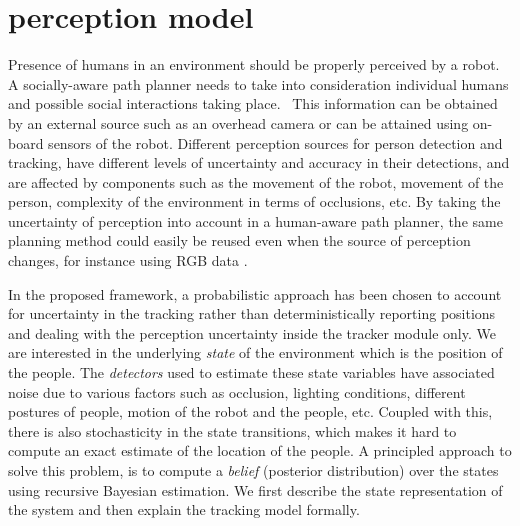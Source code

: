 \section{perception model}
\label{perception_model}


Presence of humans in an environment should be properly perceived by a robot. A socially-aware path planner needs to take into consideration individual humans and possible social interactions taking place.%
~This information can be obtained by an external source such as an overhead camera or can be attained using on-board sensors of the robot. Different perception sources for person detection and tracking, have different levels of uncertainty and accuracy in their detections, and are affected by components such as the movement of the robot, movement of the person, complexity of the environment in terms of occlusions, etc. By taking the uncertainty of perception into account in a human-aware path planner, the same planning method could easily be reused even when the source of perception changes, for instance using RGB data \cite{linder2016people}. 

In the proposed framework, a probabilistic approach has been chosen to account for uncertainty in the tracking rather than deterministically reporting positions and dealing with the perception uncertainty inside the tracker module only. We are interested in the underlying \textit{state} of the environment which is the position of the people. The \textit{detectors} used to estimate these state variables have associated noise due to various factors such as occlusion, lighting conditions, different postures of people, motion of the robot and the people, etc. Coupled with this, there is also stochasticity in the state transitions, which makes it hard to compute an exact estimate of the location of the people. A principled approach to solve this problem, is to compute a \textit{belief} (posterior distribution) over the states using recursive Bayesian estimation. We first describe the state representation of the system and then explain the tracking model formally.

